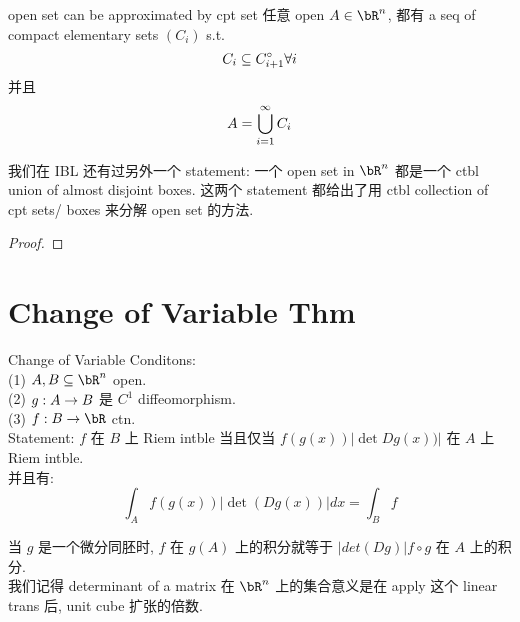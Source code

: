 \documentclass[lang=cn,11pt]{elegantbook}
\begin{document}
\begin{lemma}{open set can be approximated by cpt set}
    任意 open $A \in \bR^n$, 都有 a seq of compact elementary sets $(C_i)$ s.t. 
    $$
    C_i \subseteq C_{i+1}^{\circ} \forall i
    $$
    并且
    $$
    A = \displaystyle\bigcup_{i=1}^\infty C_i
    $$
\end{lemma}

\begin{remark}
    我们在 IBL 还有过另外一个 statement: 一个 open set in $\bR^n$ 都是一个 ctbl union of almost disjoint boxes. 这两个 statement 都给出了用 ctbl collection of cpt sets/ boxes 来分解 open set 的方法.
\end{remark}

\begin{proof}
    
\end{proof}






\chapter{Change of Variable Thm}
\begin{theorem}{Change of Variable}
Conditons:\\
(1) $A,B \sub \bR^n$ open.\\
(2) $g:A \rightarrow B$ 是 $C^1$ diffeomorphism.\\
(3) $f:B \rar \bR$ ctn.\\

Statement:
$f$ 在 $B$ 上 Riem intble 当且仅当 $f(g(x))  |\det Dg(x)) |$ 在 $A$ 上 Riem intble.\\
并且有:
$$
\int_A f(g(x)) |\det (Dg(x))| dx = \int_B f
$$
    
\end{theorem}
\begin{remark}
    当 $g$ 是一个微分同胚时, $f$ 在 $g(A)$ 上的积分就等于 $|det(Dg)| f\circ g $ 在 $A$ 上的积分.\\
    我们记得 determinant of a matrix 在 $\bR^n$ 上的集合意义是在 apply 这个 linear trans 后, unit cube 扩张的倍数.\\
\end{remark}
\end{document}
